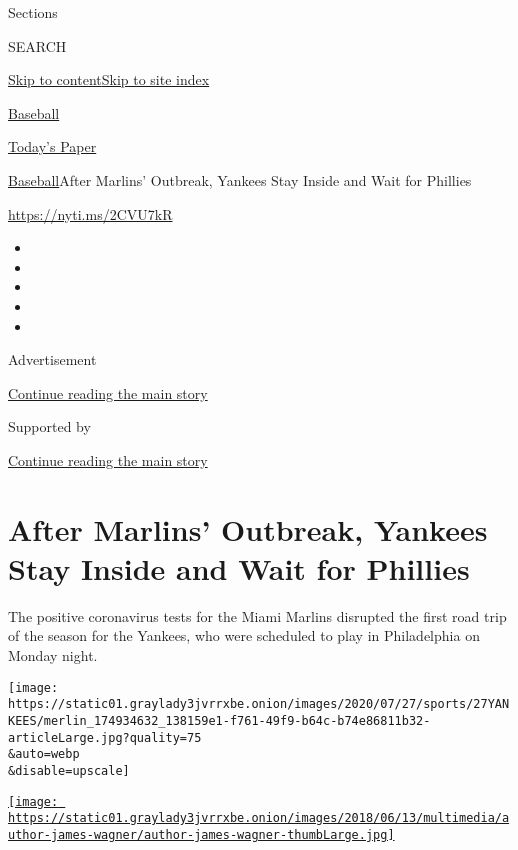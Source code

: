 Sections

SEARCH

\protect\hyperlink{site-content}{Skip to
content}\protect\hyperlink{site-index}{Skip to site index}

\href{https://www.nytimes3xbfgragh.onion/section/sports/baseball}{Baseball}

\href{https://myaccount.nytimes3xbfgragh.onion/auth/login?response_type=cookie\&client_id=vi}{}

\href{https://www.nytimes3xbfgragh.onion/section/todayspaper}{Today's
Paper}

\href{/section/sports/baseball}{Baseball}\textbar{}After Marlins'
Outbreak, Yankees Stay Inside and Wait for Phillies

\url{https://nyti.ms/2CVU7kR}

\begin{itemize}
\item
\item
\item
\item
\item
\end{itemize}

Advertisement

\protect\hyperlink{after-top}{Continue reading the main story}

Supported by

\protect\hyperlink{after-sponsor}{Continue reading the main story}

\hypertarget{after-marlins-outbreak-yankees-stay-inside-and-wait-for-phillies}{%
\section{After Marlins' Outbreak, Yankees Stay Inside and Wait for
Phillies}\label{after-marlins-outbreak-yankees-stay-inside-and-wait-for-phillies}}

The positive coronavirus tests for the Miami Marlins disrupted the first
road trip of the season for the Yankees, who were scheduled to play in
Philadelphia on Monday night.

\texttt{[image: https://static01.graylady3jvrrxbe.onion/images/2020/07/27/sports/27YANKEES/merlin\_174934632\_138159e1-f761-49f9-b64c-b74e86811b32-articleLarge.jpg?quality=75\\\&auto=webp\\\&disable=upscale]}

\href{https://www.nytimes3xbfgragh.onion/by/james-wagner}{\texttt{[image: https://static01.graylady3jvrrxbe.onion/images/2018/06/13/multimedia/author-james-wagner/author-james-wagner-thumbLarge.jpg]}}

